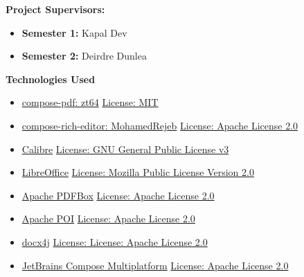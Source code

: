 \textbf{Project Supervisors:} 
\begin{itemize}
    \item \textbf{Semester 1:} Kapal Dev
    \item \textbf{Semester 2:} Deirdre Dunlea
\end{itemize}

\textbf{Technologies Used}
\begin{itemize}
    \item 
    \hyperlink{https://klibs.io/project/zt64/compose-pdf}{compose-pdf: zt64}
    \newline
    \hyperlink{https://github.com/zt64/compose-pdf/blob/main/LICENSE}{License: MIT}

    \item 
    \hyperlink{https://klibs.io/project/MohamedRejeb/compose-rich-editor}{compose-rich-editor: MohamedRejeb}
    \newline
    \hyperlink{https://github.com/MohamedRejeb/compose-rich-editor/blob/main/LICENSE}{License: Apache License 2.0}


    \item 
    \hyperlink{https://calibre-ebook.com/download_portable}{Calibre}
    \newline
    \hyperlink{https://manual.calibre-ebook.com/faq.html}{License: GNU General Public License v3}


    \item 
    \hyperlink{https://www.libreoffice.org/download/portable-versions}{LibreOffice}
    \newline
    \hyperlink{https://www.libreoffice.org/download/license/}{License: Mozilla Public License Version 2.0}
    
    \item 
    \hyperlink{https://pdfbox.apache.org/}{Apache PDFBox}
    \newline
    \hyperlink{https://www.apache.org/licenses/LICENSE-2.0}{License: Apache License 2.0}

    \item 
    \hyperlink{https://poi.apache.org/}{Apache POI}
    \newline
    \hyperlink{https://www.apache.org/licenses/LICENSE-2.0}{License: Apache License 2.0}

    \item 
    \hyperlink{https://www.docx4java.org/trac/docx4j}{docx4j}
    \newline
    \hyperlink{https://github.com/plutext/docx4j/blob/master/legals/LICENSE}{License: License: Apache License 2.0}

    \item 
    \hyperlink{https://github.com/JetBrains/compose-multiplatform}{JetBrains Compose Multiplatform}
    \newline
    \hyperlink{https://github.com/JetBrains/compose-multiplatform/blob/master/LICENSE.txt}{License: Apache License 2.0}



    
\end{itemize}
